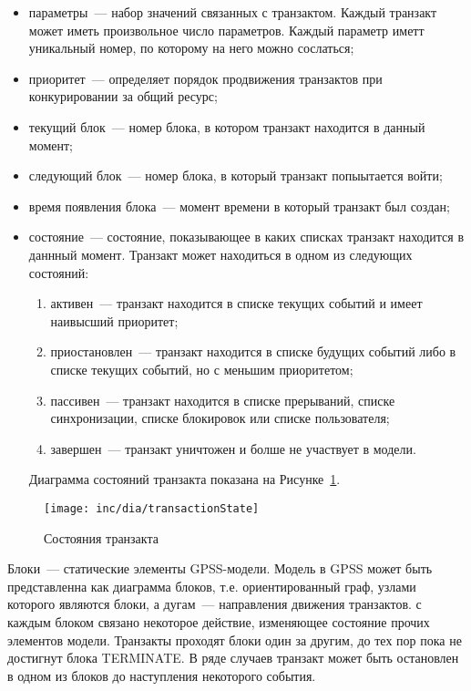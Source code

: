 \begin{itemize}
\item параметры~--- набор значений связанных с транзактом. Каждый транзакт может иметь произвольное число параметров. Каждый параметр иметт уникальный номер, по которому на него можно сослаться;
\item приоритет~--- определяет порядок продвижения транзактов при конкурировании за общий ресурс;
\item текущий блок~--- номер блока, в котором транзакт находится в данный момент;
\item следующий блок~--- номер блока, в который транзакт попыытается войти;
\item время появления блока~---  момент времени в который транзакт был создан;
\item состояние~--- состояние, показывающее в каких списках транзакт находится в даннный момент. Транзакт может находиться в одном из следующих состояний:
    \begin{enumerate}
    \item активен~--- транзакт находится в списке текущих событий и имеет наивысший приоритет;
    \item приостановлен~--- транзакт находится в списке будущих событий либо в списке текущих событий, но с меньшим приоритетом;
    \item пассивен~--- транзакт находится в списке прерываний, списке синхронизации, списке блокировок или списке пользователя;
    \item завершен~--- транзакт уничтожен и болше не участвует в модели.
    \end{enumerate}
    Диаграмма состояний транзакта показана на Рисунке~\ref{fig:transactionState}.
\end{itemize}


\begin{figure}[ht]
  \centering
  \texttt{[image: inc/dia/transactionState]}
  \caption{Состояния транзакта}
  \label{fig:transactionState}
\end{figure}


Блоки~--- статические элементы GPSS-модели. Модель в GPSS может быть представленна как диаграмма блоков, т.е. ориентированный граф, узлами которого являются блоки, а дугам~--- направления движения транзактов. с каждым блоком связано некоторое действие, изменяющее состояние прочих элементов модели. Транзакты проходят блоки один за другим, до тех пор пока не достигнут блока TERMINATE. В ряде случаев транзакт может быть остановлен в одном из блоков до наступления некоторого события.


